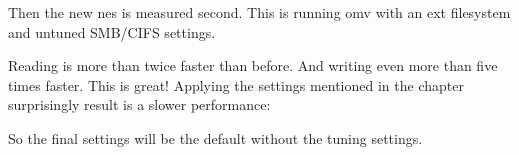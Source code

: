 
Then the new \gls{nes} is measured second. This is running \gls{omv} with an
\gls{ext} filesystem and untuned SMB/CIFS settings.


Reading is more than twice faster than before. And writing even more than five
times faster. This is great!
\bigbreak
Applying the settings mentioned in the  chapter surprisingly
result is a slower performance:


So the final settings will be the default without the tuning settings.
